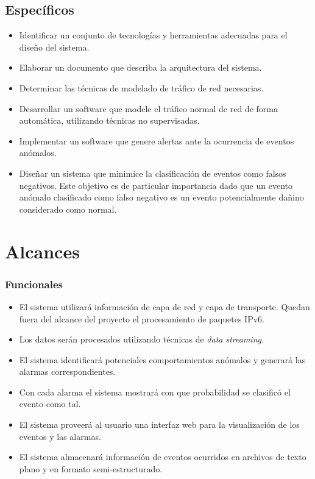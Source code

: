 \subsection*{Específicos}
\begin{itemize}

\item Identificar un conjunto de tecnologías y herramientas adecuadas para el diseño del sistema.
\item Elaborar un documento que describa la arquitectura del sistema.
\item Determinar las técnicas de modelado de tráfico de red necesarias.
\item Desarrollar un software que modele el tráfico normal de red de forma automática, utilizando técnicas no supervisadas.
\item Implementar un software que genere alertas ante la ocurrencia de eventos anómalos.
\item Diseñar un sistema que minimice la clasificación de eventos como falsos negativos. Este objetivo es de particular importancia dado que un evento anómalo clasificado como falso negativo es un evento potencialmente dañino considerado como normal.
\end{itemize}

\section*{Alcances}

\subsubsection*{Funcionales}
\begin{itemize}
	\item El sistema utilizará información de capa de red\cite{rfc791} y capa de transporte\cite{rfc793}\cite{rfc1180}. Quedan fuera del alcance del proyecto el procesamiento de paquetes IPv6.
	\item Los datos serán procesados utilizando técnicas de \textit{data streaming}\cite{Fischer:2012:RVA:2245276.2245432}.
	\item El sistema identificará potenciales comportamientos anómalos y generará las alarmas correspondientes.
	\item Con cada alarma el sistema mostrará con que probabilidad se clasificó el evento como tal.
	\item El sistema proveerá al usuario una interfaz web para la visualización de los eventos y las alarmas.
	\item El sistema almacenará información de eventos ocurridos en archivos de texto plano y en formato semi-estructurado.
\end{itemize}

